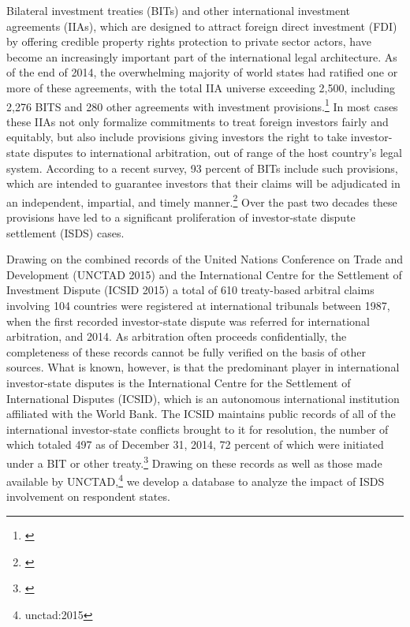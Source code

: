 \documentclass[12pt,onesided]{amsart}
\begin{document}
Bilateral investment treaties (BITs) and other international investment agreements (IIAs), which are designed to attract foreign direct investment (FDI) by offering credible property rights protection to private sector actors, have become an increasingly important part of the international legal architecture. As of the end of 2014, the overwhelming majority of world states had ratified one or more of these agreements, with the total IIA universe exceeding 2,500, including 2,276 BITS and 280 other agreements with investment provisions.\footnote{\citet{unctad:2015}} In most cases these IIAs not only formalize commitments to treat foreign investors fairly and equitably, but also include provisions giving investors the right to take investor-state disputes to international arbitration, out of range of the host country's legal system. According to a recent survey, 93 percent of BITs include such provisions, which are intended to guarantee investors that their claims will be adjudicated in an independent, impartial, and timely manner.\footnote{\citet[p. 8]{gaukordger:gordon:2012}} Over the past two decades these provisions have led to a significant proliferation of investor-state dispute settlement (ISDS) cases.


Drawing on the combined records of the United Nations Conference on Trade and Development (UNCTAD 2015) and the International Centre for the Settlement of Investment Dispute (ICSID 2015) a total of 610 treaty-based arbitral claims involving 104 countries were registered at international tribunals between 1987, when the first recorded investor-state dispute was referred for international arbitration, and 2014. As arbitration often proceeds confidentially, the completeness of these records cannot be fully verified on the basis of other sources. What is known, however, is that the predominant player in international investor-state disputes is the International Centre for the Settlement of International Disputes (ICSID), which is an autonomous international institution affiliated with the World Bank. The ICSID maintains public records of all of the international investor-state conflicts brought to it for resolution, the number of which totaled 497 as of December 31, 2014, 72 percent of which were initiated under a BIT or other treaty.\footnote{\citet[p. 7, 10]{icsid:2015}} Drawing on these records as well as those made available by UNCTAD,\footnote{unctad:2015} we develop a database to analyze the impact of ISDS involvement on respondent states. 
\end{document}
